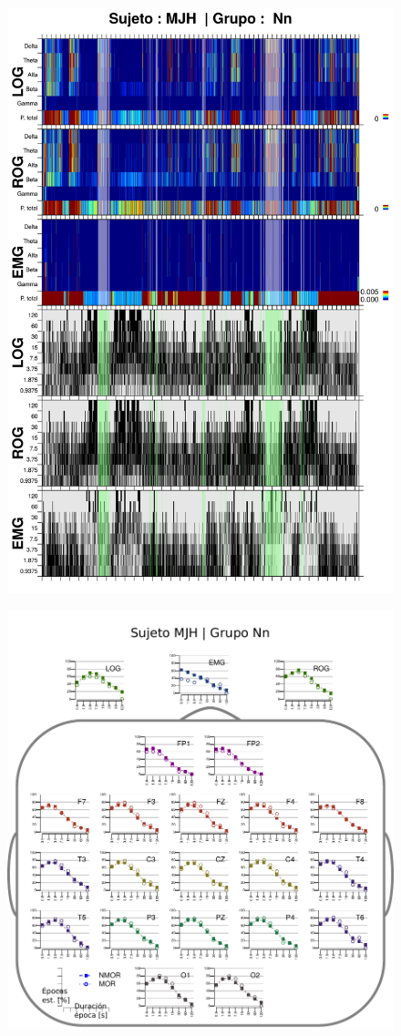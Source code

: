 \begin{figure}
\centering
\includegraphics[width=0.9\linewidth]
{./img_resultados/MJNNVIGILOS_combinado_.png} 
\end{figure}

\begin{figure}
\centering
\includegraphics[width=.9\linewidth]{./img_resultados/cabeza_MJH.pdf}
\end{figure}

